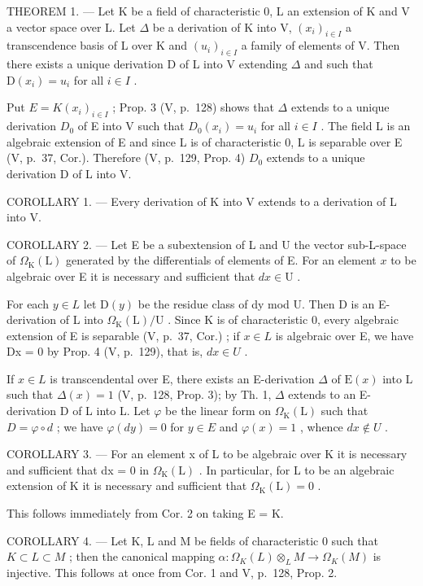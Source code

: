 THEOREM 1. --- Let K be a field of characteristic 0, L an extension of K and V a vector space over L. Let \(\Delta\) be a derivation of K into V, \((x_{i})_{i\in I}\) a transcendence basis of L over K and \((u_{i})_{i\in I}\) a family of elements of V. Then there exists a unique derivation D of L into V extending \(\Delta\) and such that \(\mathrm{D}(x_{i})=u_{i}\) for all \(i\in I\) .

Put \(E = K(x_{i})_{i \in I}\) ; Prop. 3 (V, p.~128) shows that \(\Delta\) extends to a unique derivation \(D_{0}\) of E into V such that \(D_{0}(x_{i}) = u_{i}\) for all \(i \in I\) . The field L is an algebraic extension of E and since L is of characteristic 0, L is separable over E (V, p.~37, Cor.). Therefore (V, p.~129, Prop. 4) \(D_{0}\) extends to a unique derivation D of L into V.

COROLLARY 1. --- Every derivation of K into V extends to a derivation of L into V.

COROLLARY 2. --- Let E be a subextension of L and U the vector sub-L-space of \(\Omega_{\mathrm{K}}(\mathrm{L})\) generated by the differentials of elements of E. For an element \(x\) to be algebraic over E it is necessary and sufficient that \(dx \in \mathrm{U}\) .

For each \(y \in L\) let \(\mathrm{D}(y)\) be the residue class of dy mod U. Then D is an E-derivation of L into \(\Omega_{\mathrm{K}}(\mathrm{L})/\mathrm{U}\) . Since K is of characteristic 0, every algebraic extension of E is separable (V, p.~37, Cor.) ; if \(x \in L\) is algebraic over E, we have Dx = 0 by Prop. 4 (V, p.~129), that is, \(dx \in U\) .

If \(x \in L\) is transcendental over E, there exists an E-derivation \(\Delta\) of \(\mathrm{E}(x)\) into L such that \(\Delta(x) = 1\) (V, p.~128, Prop. 3); by Th. 1, \(\Delta\) extends to an E-derivation D of L into L. Let \(\varphi\) be the linear form on \(\Omega_{\mathrm{K}}(\mathrm{L})\) such that \(D = \varphi \circ d\) ; we have \(\varphi(dy) = 0\) for \(y \in E\) and \(\varphi(x) = 1\) , whence \(dx \notin U\) .

COROLLARY 3. --- For an element x of L to be algebraic over K it is necessary and sufficient that dx = 0 in \(\Omega_{\mathrm{K}}(\mathrm{L})\) . In particular, for L to be an algebraic extension of K it is necessary and sufficient that \(\Omega_{\mathrm{K}}(\mathrm{L}) = 0\) .

This follows immediately from Cor. 2 on taking E = K.

COROLLARY 4. --- Let K, L and M be fields of characteristic 0 such that \(K \subset L \subset M\) ; then the canonical mapping \(\alpha: \Omega_{K}(L) \otimes_{L} M \to \Omega_{K}(M)\) is injective. This follows at once from Cor. 1 and V, p.~128, Prop. 2.

